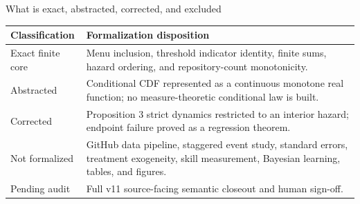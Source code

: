 \documentclass[aspectratio=169,9pt]{beamer}
\begin{document}
\begin{frame}[t]{What is exact, abstracted, corrected, and excluded}
  \vspace{0.16cm}
  {\small
  \begin{tabular}{@{}p{.17\linewidth}p{.73\linewidth}@{}}
    \toprule
    \textbf{Classification} & \textbf{Formalization disposition} \\
    \midrule
    Exact finite core &
      Menu inclusion, threshold indicator identity, finite sums, hazard ordering,
      and repository-count monotonicity. \\
    Abstracted &
      Conditional CDF represented as a continuous monotone real function;
      no measure-theoretic conditional law is built. \\
    Corrected &
      Proposition 3 strict dynamics restricted to an interior hazard; endpoint
      failure proved as a regression theorem. \\
    Not formalized &
      GitHub data pipeline, staggered event study, standard errors, treatment
      exogeneity, skill measurement, Bayesian learning, tables, and figures. \\
    Pending audit &
      Full v11 source-facing semantic closeout and human sign-off. \\
    \bottomrule
  \end{tabular}}\par
  \vspace{0.30cm}
\end{frame}
\end{document}
